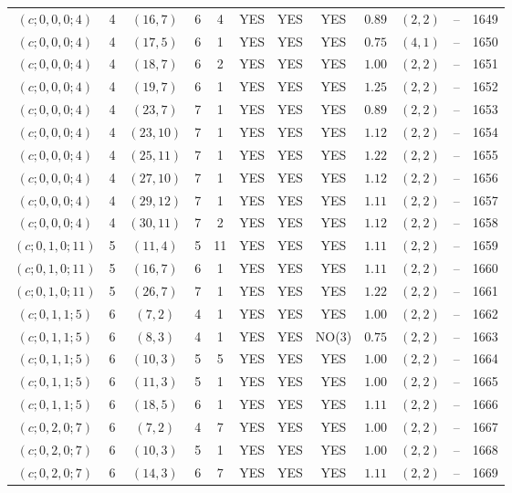 \begin{longtable}{|c|c|c|c|c|c|c|c|c|c|c|c|}
$(c;0,0,0;4)$ & 4 & $(16,7)$ & 6 & 4 & YES & YES & YES & $0.89$ & $(2,2)$ & -- & 1649\\
$(c;0,0,0;4)$ & 4 & $(17,5)$ & 6 & 1 & YES & YES & YES & $0.75$ & $(4,1)$ & -- & 1650\\
$(c;0,0,0;4)$ & 4 & $(18,7)$ & 6 & 2 & YES & YES & YES & $1.00$ & $(2,2)$ & -- & 1651\\
$(c;0,0,0;4)$ & 4 & $(19,7)$ & 6 & 1 & YES & YES & YES & $1.25$ & $(2,2)$ & -- & 1652\\
$(c;0,0,0;4)$ & 4 & $(23,7)$ & 7 & 1 & YES & YES & YES & $0.89$ & $(2,2)$ & -- & 1653\\
$(c;0,0,0;4)$ & 4 & $(23,10)$ & 7 & 1 & YES & YES & YES & $1.12$ & $(2,2)$ & -- & 1654\\
$(c;0,0,0;4)$ & 4 & $(25,11)$ & 7 & 1 & YES & YES & YES & $1.22$ & $(2,2)$ & -- & 1655\\
$(c;0,0,0;4)$ & 4 & $(27,10)$ & 7 & 1 & YES & YES & YES & $1.12$ & $(2,2)$ & -- & 1656\\
$(c;0,0,0;4)$ & 4 & $(29,12)$ & 7 & 1 & YES & YES & YES & $1.11$ & $(2,2)$ & -- & 1657\\
$(c;0,0,0;4)$ & 4 & $(30,11)$ & 7 & 2 & YES & YES & YES & $1.12$ & $(2,2)$ & -- & 1658\\
$(c;0,1,0;11)$ & 5 & $(11,4)$ & 5 & 11 & YES & YES & YES & $1.11$ & $(2,2)$ & -- & 1659\\
$(c;0,1,0;11)$ & 5 & $(16,7)$ & 6 & 1 & YES & YES & YES & $1.11$ & $(2,2)$ & -- & 1660\\
$(c;0,1,0;11)$ & 5 & $(26,7)$ & 7 & 1 & YES & YES & YES & $1.22$ & $(2,2)$ & -- & 1661\\
$(c;0,1,1;5)$ & 6 & $(7,2)$ & 4 & 1 & YES & YES & YES & $1.00$ & $(2,2)$ & -- & 1662\\
$(c;0,1,1;5)$ & 6 & $(8,3)$ & 4 & 1 & YES & YES & NO(3) & $0.75$ & $(2,2)$ & -- & 1663\\
$(c;0,1,1;5)$ & 6 & $(10,3)$ & 5 & 5 & YES & YES & YES & $1.00$ & $(2,2)$ & -- & 1664\\
$(c;0,1,1;5)$ & 6 & $(11,3)$ & 5 & 1 & YES & YES & YES & $1.00$ & $(2,2)$ & -- & 1665\\
$(c;0,1,1;5)$ & 6 & $(18,5)$ & 6 & 1 & YES & YES & YES & $1.11$ & $(2,2)$ & -- & 1666\\
$(c;0,2,0;7)$ & 6 & $(7,2)$ & 4 & 7 & YES & YES & YES & $1.00$ & $(2,2)$ & -- & 1667\\
$(c;0,2,0;7)$ & 6 & $(10,3)$ & 5 & 1 & YES & YES & YES & $1.00$ & $(2,2)$ & -- & 1668\\
$(c;0,2,0;7)$ & 6 & $(14,3)$ & 6 & 7 & YES & YES & YES & $1.11$ & $(2,2)$ & -- & 1669\\

\end{longtable}
